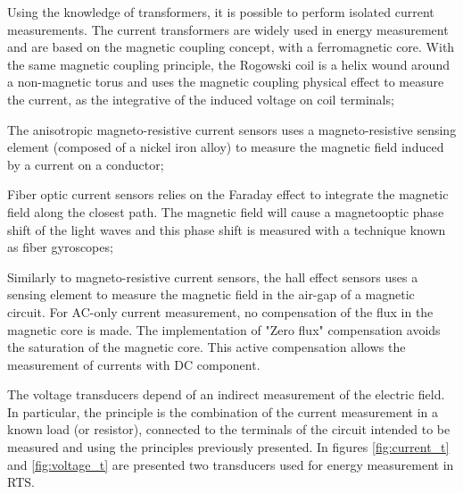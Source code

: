 	\begin{description}
		\setlength\itemsep{-0em}
		\item [Magnetic coupling] Using the knowledge of transformers, it is possible to perform isolated current measurements. The current transformers are widely used in energy measurement and are based on the magnetic coupling concept, with a ferromagnetic core. With the same magnetic coupling principle, the Rogowski coil is a helix wound around a non-magnetic torus and uses the magnetic coupling physical effect to measure the current, as the integrative of the induced voltage on coil terminals;
		\item [Magneto resistance] The anisotropic magneto-resistive current sensors uses a magneto-resistive sensing element (composed of a nickel iron alloy) to measure the magnetic field induced by a current on a conductor;
		\item [Faraday induction] Fiber optic current sensors relies on the Faraday effect to integrate the magnetic field along the closest path. The magnetic field will cause a magnetooptic phase shift of the light waves and this phase shift is measured with a technique known as fiber gyroscopes;
		\item [Hall Effect] Similarly to magneto-resistive current sensors, the hall effect sensors uses a sensing element to measure the magnetic field in the air-gap of a magnetic circuit. For AC-only current measurement, no compensation of the flux in the magnetic core is made. The implementation of "Zero flux" compensation avoids the saturation of the magnetic core. This active compensation allows the measurement of currents with DC component.
		
	\end{description}

	The voltage transducers depend of an indirect measurement of the electric field. In particular, the principle is the combination of the current measurement in a known load (or resistor), connected to the terminals of the circuit intended to be measured and using the principles previously presented. In figures \ref{fig:current_t} and \ref{fig:voltage_t} are presented two transducers used for energy measurement in RTS.
	
